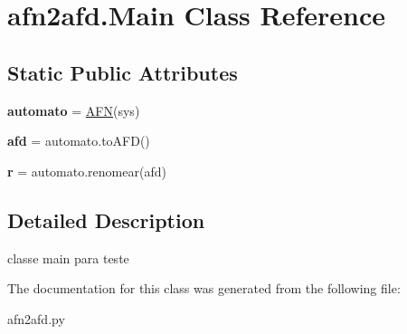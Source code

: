 \hypertarget{classafn2afd_1_1Main}{}\section{afn2afd.\+Main Class Reference}
\label{classafn2afd_1_1Main}
\subsection*{Static Public Attributes}
\begin{DoxyCompactItemize}
\item 
{\bfseries automato} = \hyperlink{classafn2afd_1_1AFN}{A\+FN}(sys)\hypertarget{classafn2afd_1_1Main_a58a54217e22d5c7bd699dbb3f8808ddb}{}\label{classafn2afd_1_1Main_a58a54217e22d5c7bd699dbb3f8808ddb}

\item 
{\bfseries afd} = automato.\+to\+A\+FD()\hypertarget{classafn2afd_1_1Main_a551386b328c1d07da68695b1313ac875}{}\label{classafn2afd_1_1Main_a551386b328c1d07da68695b1313ac875}

\item 
{\bfseries r} = automato.\+renomear(afd)\hypertarget{classafn2afd_1_1Main_aa75ea63aedf651264e28cc0e0809af05}{}\label{classafn2afd_1_1Main_aa75ea63aedf651264e28cc0e0809af05}

\end{DoxyCompactItemize}


\subsection{Detailed Description}
\begin{DoxyVerb}classe main para teste \end{DoxyVerb}
 

The documentation for this class was generated from the following file\+:\begin{DoxyCompactItemize}
\item 
afn2afd.\+py\end{DoxyCompactItemize}
